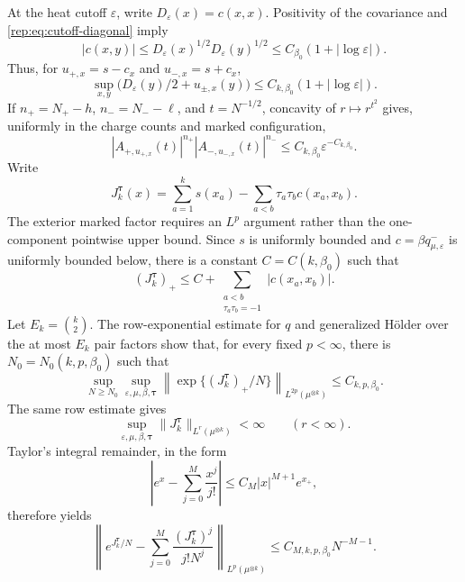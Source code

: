 \documentclass[11pt,reqno]{amsart}
\numberwithin{equation}{section}
\theoremstyle{plain}
\theoremstyle{definition}
\newcommand{\be}{\beta}
\newcommand{\vep}{\varepsilon}
\begin{document}
At the heat cutoff $\vep$, write $D_\vep(x)=c(x,x)$.  Positivity of the covariance and \eqref{rep:eq:cutoff-diagonal} imply
\begin{equation}
 |c(x,y)|\le D_\vep(x)^{1/2}D_\vep(y)^{1/2}
 \le C_{\be_0}(1+|\log\vep|).
\end{equation}
Thus, for $u_{+,x}=s-c_x$ and $u_{-,x}=s+c_x$,
\begin{equation}
 \sup_{x,y}\bigl(D_\vep(y)/2+u_{\pm,x}(y)\bigr)
 \le C_{k,\be_0}(1+|\log\vep|).
\end{equation}
If $n_+=N_+-h$, $n_-=N_--\ell$, and $t=N^{-1/2}$, concavity of $r\mapsto r^{t^2}$ gives, uniformly in the charge counts and marked configuration,
\begin{equation}\label{rep:eq:arbitrary-deterministic-cutoff-cost}
 |A_{+,u_{+,x}}(t)|^{n_+}|A_{-,u_{-,x}}(t)|^{n_-}
 \le C_{k,\be_0}\vep^{-C_{k,\be_0}}.
\end{equation}
Write
\begin{equation}
 J_k^{\boldsymbol\tau}(x)
 =\sum_{a=1}^k s(x_a)-\sum_{a<b}\tau_a\tau_b c(x_a,x_b).
\end{equation}
The exterior marked factor requires an $L^p$ argument rather than the
one-component pointwise upper bound.  Since $s$ is uniformly bounded and
$c=\be q^-_{\mu,\vep}$ is uniformly bounded below, there is a constant
$C=C(k,\be_0)$ such that
\begin{equation}
 (J_k^{\boldsymbol\tau})_+
 \le C+\sum_{\substack{a<b\\ \tau_a\tau_b=-1}}|c(x_a,x_b)|.
\end{equation}
Let $E_k=\binom{k}{2}$.  The row-exponential estimate for $q$ and generalized
H\"older over the at most $E_k$ pair factors show that, for every fixed
$p<\infty$, there is $N_0=N_0(k,p,\be_0)$ such that
\begin{equation}\label{rep:eq:signed-exterior-exponential}
 \sup_{N\ge N_0}\sup_{\vep,\mu,\be,\boldsymbol\tau}
 \left\|\exp\{(J_k^{\boldsymbol\tau})_+/N\}\right\|_{L^{2p}(\mu^{\otimes k})}
 \le C_{k,p,\be_0}.
\end{equation}
The same row estimate gives
\begin{equation}\label{rep:eq:signed-exterior-moments}
 \sup_{\vep,\mu,\be,\boldsymbol\tau}
 \|J_k^{\boldsymbol\tau}\|_{L^r(\mu^{\otimes k})}<\infty
 \qquad (r<\infty).
\end{equation}
Taylor's integral remainder, in the form
\begin{equation}
 \left|e^x-\sum_{j=0}^{M}\frac{x^j}{j!}\right|
 \le C_M |x|^{M+1}e^{x_+},
\end{equation}
therefore yields
\begin{equation}\label{rep:eq:signed-exterior-expansion}
 \left\|e^{J_k^{\boldsymbol\tau}/N}
 -\sum_{j=0}^{M}\frac{(J_k^{\boldsymbol\tau})^j}{j!N^j}
 \right\|_{L^p(\mu^{\otimes k})}
 \le C_{M,k,p,\be_0}N^{-M-1}.
\end{equation}
\end{document}
